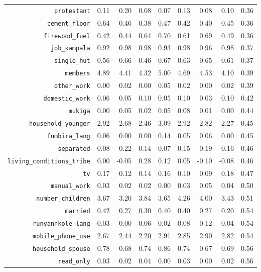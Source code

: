 \begin{longtable}{rrrrrrrrr}
  {\texttt{protestant}} & 0.11 & 0.20 & 0.08 & 0.07 & 0.13 & 0.08 & 0.10 & 0.36 \\ 
  {\texttt{cement\_floor}} & 0.64 & 0.46 & 0.38 & 0.47 & 0.42 & 0.40 & 0.45 & 0.36 \\ 
  {\texttt{firewood\_fuel}} & 0.42 & 0.44 & 0.64 & 0.70 & 0.61 & 0.69 & 0.49 & 0.36 \\ 
  {\texttt{job\_kampala}} & 0.92 & 0.98 & 0.98 & 0.93 & 0.98 & 0.96 & 0.98 & 0.37 \\ 
  {\texttt{single\_hut}} & 0.56 & 0.66 & 0.46 & 0.67 & 0.63 & 0.65 & 0.61 & 0.37 \\ 
  {\texttt{members}} & 4.89 & 4.41 & 4.32 & 5.00 & 4.69 & 4.53 & 4.10 & 0.39 \\ 
  {\texttt{other\_work}} & 0.00 & 0.02 & 0.00 & 0.05 & 0.02 & 0.00 & 0.02 & 0.39 \\ 
  {\texttt{domestic\_work}} & 0.06 & 0.05 & 0.10 & 0.05 & 0.10 & 0.03 & 0.10 & 0.42 \\ 
  {\texttt{mukiga}} & 0.00 & 0.05 & 0.02 & 0.05 & 0.08 & 0.01 & 0.00 & 0.44 \\ 
  {\texttt{household\_younger}} & 2.92 & 2.68 & 2.46 & 3.09 & 2.92 & 2.82 & 2.27 & 0.45 \\ 
  {\texttt{fumbira\_lang}} & 0.06 & 0.00 & 0.00 & 0.14 & 0.05 & 0.06 & 0.00 & 0.45 \\ 
  {\texttt{separated}} & 0.08 & 0.22 & 0.14 & 0.07 & 0.15 & 0.19 & 0.16 & 0.46 \\ 
  {\texttt{living\_conditions\_tribe}} & 0.00 & -0.05 & 0.28 & 0.12 & 0.05 & -0.10 & -0.08 & 0.46 \\ 
  {\texttt{tv}} & 0.17 & 0.12 & 0.14 & 0.16 & 0.10 & 0.09 & 0.18 & 0.47 \\ 
  {\texttt{manual\_work}} & 0.03 & 0.02 & 0.02 & 0.00 & 0.03 & 0.05 & 0.04 & 0.50 \\ 
  {\texttt{number\_children}} & 3.67 & 3.20 & 3.84 & 3.65 & 4.26 & 4.00 & 3.43 & 0.51 \\ 
  {\texttt{married}} & 0.42 & 0.27 & 0.30 & 0.40 & 0.40 & 0.27 & 0.20 & 0.54 \\ 
  {\texttt{runyannkole\_lang}} & 0.03 & 0.00 & 0.06 & 0.02 & 0.08 & 0.12 & 0.04 & 0.54 \\ 
  {\texttt{mobile\_phone\_use}} & 2.67 & 2.44 & 2.20 & 2.91 & 2.85 & 2.90 & 2.82 & 0.54 \\ 
  {\texttt{household\_spouse}} & 0.78 & 0.68 & 0.74 & 0.86 & 0.74 & 0.67 & 0.69 & 0.56 \\ 
  {\texttt{read\_only}} & 0.03 & 0.02 & 0.04 & 0.00 & 0.03 & 0.00 & 0.02 & 0.56 \\ 

\end{longtable}

